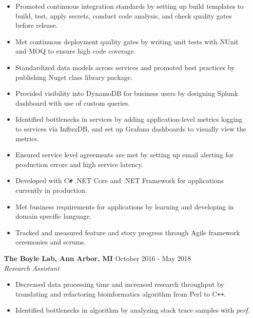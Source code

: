 \documentclass[overlapped]{res}
\begin{document}
\begin{resume}
\begin{itemize}
    \item Promoted continuous integration standards by setting up build templates to build,
    test, apply secrets, conduct code analysis,
    and check quality gates before release.

    \item Met continuous deployment quality gates by writing unit tests
    with NUnit and MOQ to ensure high code coverage.

    \item Standardized data models across services
    and promoted best practices
    by publishing Nuget class library package.

    \item Provided visibility into DynamoDB for business users
    by designing Splunk dashboard with use of
    custom queries.

    \item Identified bottlenecks in services by adding application-level
    metrics logging to services via InfluxDB,
    and set up Grafana dashboards to visually view the metrics.

    \item Ensured service level agreements are met by setting up email alerting 
    for production errors and high service latency.

    \item Developed with C\texttt{\#} .NET Core and .NET Framework
    for applications currently in production.

    \item Met business requirements for applications by learning
    and developing in domain specific language.

    \item Tracked and measured feature and story progress through
    Agile framework ceremonies and scrums.

\end{itemize}

\textbf{The Boyle Lab, Ann Arbor, MI}
\hfill October 2016 - May 2018 \\
{\sl Research Assistant}
    \begin{itemize}  \itemsep -2pt %
    \item Decreased data processing time and increased research throughput
    by translating and refactoring bioinformatics algorithm 
    from Perl to C\texttt{++}.
    
    \item Identified bottlenecks in algorithm by analyzing stack trace samples with \textit{perf}.
    

\end{itemize}
\end{resume}
\end{document}
